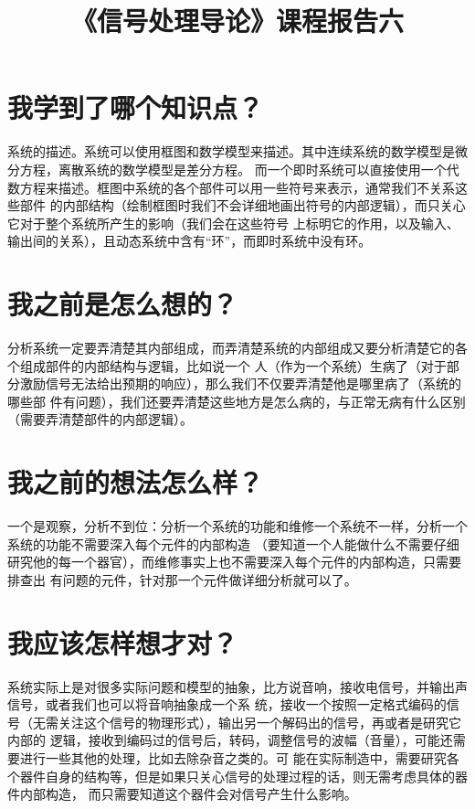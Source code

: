 \documentclass{ctexart}
\title{《信号处理导论》课程报告六}
\begin{document}
    \maketitle

    \section{我学到了哪个知识点？}

    系统的描述。系统可以使用框图和数学模型来描述。其中连续系统的数学模型是微分方程，离散系统的数学模型是差分方程。
    而一个即时系统可以直接使用一个代数方程来描述。框图中系统的各个部件可以用一些符号来表示，通常我们不关系这些部件
    的内部结构（绘制框图时我们不会详细地画出符号的内部逻辑），而只关心它对于整个系统所产生的影响（我们会在这些符号
    上标明它的作用，以及输入、输出间的关系），且动态系统中含有``环''，而即时系统中没有环。

    \section{我之前是怎么想的？}

    分析系统一定要弄清楚其内部组成，而弄清楚系统的内部组成又要分析清楚它的各个组成部件的内部结构与逻辑，比如说一个
    人（作为一个系统）生病了（对于部分激励信号无法给出预期的响应），那么我们不仅要弄清楚他是哪里病了（系统的哪些部
    件有问题），我们还要弄清楚这些地方是怎么病的，与正常无病有什么区别（需要弄清楚部件的内部逻辑）。

    \section{我之前的想法怎么样？}

    一个是观察，分析不到位：分析一个系统的功能和维修一个系统不一样，分析一个系统的功能不需要深入每个元件的内部构造
    （要知道一个人能做什么不需要仔细研究他的每一个器官），而维修事实上也不需要深入每个元件的内部构造，只需要排查出
    有问题的元件，针对那一个元件做详细分析就可以了。

    \section{我应该怎样想才对？}

    系统实际上是对很多实际问题和模型的抽象，比方说音响，接收电信号，并输出声信号，或者我们也可以将音响抽象成一个系
    统，接收一个按照一定格式编码的信号（无需关注这个信号的物理形式），输出另一个解码出的信号，再或者是研究它内部的
    逻辑，接收到编码过的信号后，转码，调整信号的波幅（音量），可能还需要进行一些其他的处理，比如去除杂音之类的。可
    能在实际制造中，需要研究各个器件自身的结构等，但是如果只关心信号的处理过程的话，则无需考虑具体的器件内部构造，
    而只需要知道这个器件会对信号产生什么影响。
\end{document}
